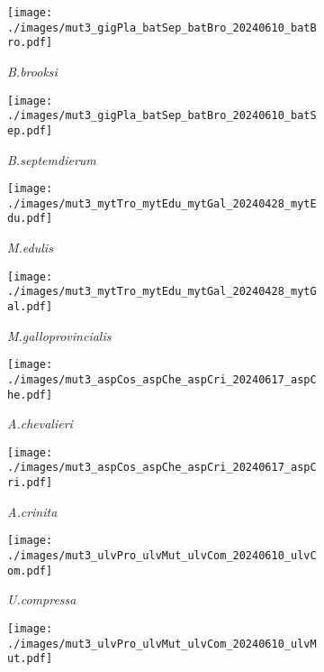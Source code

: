 \documentclass{article}
\begin{document}
\begin{figure}[h!]
    \centering
    \begin{subfigure}{0.32\textwidth}
      \centering
      \texttt{[image: ./images/mut3\_gigPla\_batSep\_batBro\_20240610\_batBro.pdf]}
      \caption{\textit{B.brooksi}}
      \label{fig:fig1a}
    \end{subfigure}
    \hfill
    \begin{subfigure}{0.32\textwidth}
      \centering
      \texttt{[image: ./images/mut3\_gigPla\_batSep\_batBro\_20240610\_batSep.pdf]}
      \caption{\textit{B.septemdierum}}
      \label{fig:fig1b}
    \end{subfigure}
    \hfill
    \begin{subfigure}{0.32\textwidth}
      \centering
      \texttt{[image: ./images/mut3\_mytTro\_mytEdu\_mytGal\_20240428\_mytEdu.pdf]}
      \caption{\textit{M.edulis}}
      \label{fig:fig1c}
    \end{subfigure}
    \vspace{0.1cm}
    \begin{subfigure}{0.32\textwidth}
      \centering
      \texttt{[image: ./images/mut3\_mytTro\_mytEdu\_mytGal\_20240428\_mytGal.pdf]}
      \caption{\textit{M.galloprovincialis}}
      \label{fig:fig1d}
    \end{subfigure}
    \hfill
    \begin{subfigure}{0.32\textwidth}
        \centering
        \texttt{[image: ./images/mut3\_aspCos\_aspChe\_aspCri\_20240617\_aspChe.pdf]}
        \caption{\textit{A.chevalieri}}
        \label{fig:fig1e}
    \end{subfigure}
    \hfill
    \begin{subfigure}{0.32\textwidth}
        \centering
        \texttt{[image: ./images/mut3\_aspCos\_aspChe\_aspCri\_20240617\_aspCri.pdf]}
        \caption{\textit{A.crinita}}
        \label{fig:fig1f}
    \end{subfigure}
    \vspace{0.1cm}
    \begin{subfigure}{0.32\textwidth}
      \centering
      \texttt{[image: ./images/mut3\_ulvPro\_ulvMut\_ulvCom\_20240610\_ulvCom.pdf]}
      \caption{\textit{U.compressa}}
      \label{fig:fig1g}
    \end{subfigure}
    \hfill
    \begin{subfigure}{0.32\textwidth}
      \centering
      \texttt{[image: ./images/mut3\_ulvPro\_ulvMut\_ulvCom\_20240610\_ulvMut.pdf]}

\end{subfigure}
\end{figure}
\end{document}
